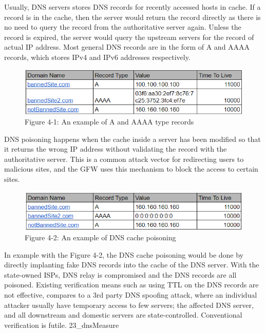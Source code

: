 Usually, DNS servers stores DNS records for recently accessed hosts in
cache. If a record is in the cache, then the server would return the
record directly as there is no need to query the record from the
authoritative server again. \cite{22_dnsConcpets} Unless the record is
expired, the server would query the upstream servers for the record of
actual IP address. Most general DNS records are in the form of A and
AAAA records, which stores IPv4 and IPv6 addresses respectively.

\begin{figure}
\centering
\includegraphics{res/4.1-DNS.png}
\caption{Figure 4-1: An example of A and AAAA type records}
\end{figure}

DNS poisoning happens when the cache inside a server has been modified
so that it returns the wrong IP address without validating the record
with the authoritative server. This is a common attack vector for
redirecting users to malicious sites, and the GFW uses this mechanism to
block the access to certain sites.

\begin{figure}
\centering
\includegraphics{res/4.2-DNS-poisoned.png}
\caption{Figure 4-2: An example of DNS cache poisoning}
\end{figure}

In example with the Figure 4-2, the DNS cache poisoning would be done by
directly implanting fake DNS records into the cache of the DNS server.
With the state-owned ISPs, DNS relay is compromised and the DNS records
are all poisoned. Existing verification means such as using TTL on the
DNS records are not effective, compares to a 3rd party DNS spoofing
attack, where an individual attacker usually have temporary access to
few servers; the affected DNS server, and all downstream and domestic
servers are state-controlled. Conventional verification is futile.
23\_dnsMeasure

